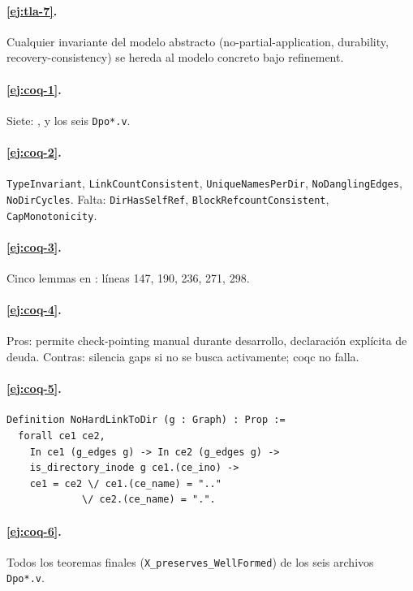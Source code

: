 \paragraph{\ref{ej:tla-7}.} Cualquier invariante del modelo abstracto
(no-partial-application, durability, recovery-consistency) se hereda al
modelo concreto bajo refinement.

\paragraph{\ref{ej:coq-1}.} Siete: , y los seis
\texttt{Dpo*.v}.

\paragraph{\ref{ej:coq-2}.} \texttt{TypeInvariant},
\texttt{LinkCountConsistent}, \texttt{UniqueNamesPerDir},
\texttt{NoDanglingEdges}, \texttt{NoDirCycles}. Falta:
\texttt{DirHasSelfRef}, \texttt{BlockRefcountConsistent},
\texttt{CapMonotonicity}.

\paragraph{\ref{ej:coq-3}.} Cinco lemmas en :
líneas 147, 190, 236, 271, 298.

\paragraph{\ref{ej:coq-4}.} Pros: permite check-pointing manual durante
desarrollo, declaración explícita de deuda. Contras: silencia gaps si
no se busca activamente; coqc no falla.

\paragraph{\ref{ej:coq-5}.}
\begin{lstlisting}[language=coq]
Definition NoHardLinkToDir (g : Graph) : Prop :=
  forall ce1 ce2,
    In ce1 (g_edges g) -> In ce2 (g_edges g) ->
    is_directory_inode g ce1.(ce_ino) ->
    ce1 = ce2 \/ ce1.(ce_name) = ".."
             \/ ce2.(ce_name) = ".".
\end{lstlisting}

\paragraph{\ref{ej:coq-6}.} Todos los teoremas finales (\texttt{X\_preserves\_WellFormed})
de los seis archivos \texttt{Dpo*.v}.

